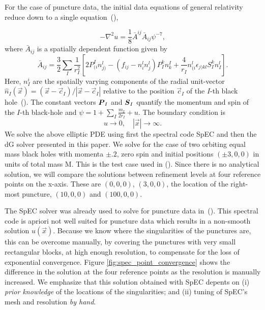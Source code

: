 For the case of puncture data, the initial data equations of general relativity
reduce down to a single equation~(\citet*{brandt1997simple}),

\begin{equation}
\label{eq:Two_Punctures_PDE}
-\nabla^2 u = \frac{1}{8}\bar A^{ij} \bar A_{ij}\psi^{-7},
\end{equation}
%
where $\bar A_{ij}$ is a spatially dependent function given by
%
\begin{equation}
  \label{eq:Two_Punctures_Aij}
\bar{A}_{ij} = \frac{3}{2}\sum_{I}\frac{1}{r^{2}_{I}}[2P^{I}_{(i}n^{l}_{j)}-(f_{ij}-n^{l}_{i}n^l_j)P^{k}_{I}n^I_k + \frac{4}{r_{I}}n^l_{(i}\epsilon_{j)kl}S^k_In^l_I].
\end{equation}
%
Here, $n^i_I$ are the spatially varying components of the radial unit-vector $\hat n_{I}(\vec x)=(\vec{x}-\vec c_{I})/|\vec x-\vec c_I|$ relative to the position $\vec c_I$ of the $I$-th black hole~(\citet*{brandt1997simple}). The constant vectors $\boldsymbol{P}_{I}$ and $\boldsymbol{S}_{I}$
quantify the momentum and spin of the $I$-th black-hole and $\psi = 1 + \sum_I \frac{m_{I}}{2r_{I}}+u$. The boundary condition is
%
\begin{equation}
  u\to 0,\quad |\vec x| \to \infty.
\end{equation}
%
We solve the above elliptic PDE using first the spectral code SpEC and
then the dG solver presented in this paper. We solve for the case of
two orbiting equal mass black holes with momenta $\pm .2$, zero spin
and initial positions $(\pm 3, 0, 0)$ in units of total mass M. This
is the test case used in (\citet*{ansorg2007}). Since there is no
analytical solution, we will compare the solutions between refinement
levels at four reference points on the x-axis. These are $(0,0,0)$,
$(3,0,0)$, the location of the right-most puncture, $(10,0,0)$ and
$(100,0,0)$.

The SpEC solver was already used to solve for puncture data
in~(\citet*{dennison2006,lovelace2008}).  This spectral code is apriori
not well suited for puncture data which results in a non-smooth
solution $u(\vec x)$.  Because we know where the singularities of the
punctures are, this can be overcome manually, by covering the
punctures with very small rectangular blocks, at high enough
resolution, to compensate for the loss of exponential
convergence. Figure \ref{fig:spec_point_convergence} shows the
difference in the solution at the four reference points as the
resolution is manually increased. We emphasize that this
  solution obtained with SpEC depents on (i) \textit{prior knowledge}
  of the locations of the singularities; and (ii) tuning of SpEC's
  mesh and resolution \textit{by hand}.

